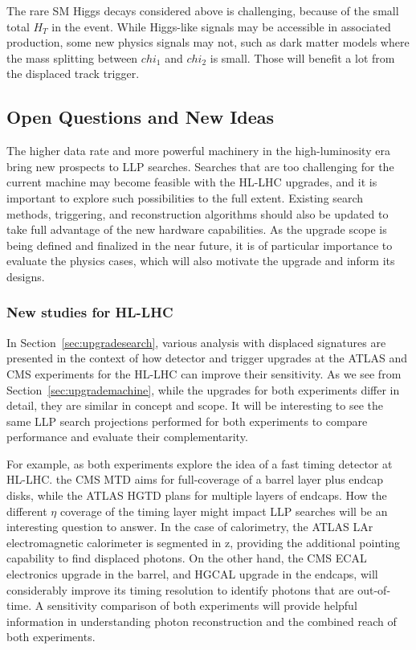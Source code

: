 The rare SM Higgs decays considered above is challenging, because of the small total $H_T$ in the event. 
While Higgs-like signals may be accessible in associated production, some new physics signals may not, such as dark matter models where the mass splitting between $chi_1$ and $chi_2$ is small. 
Those will benefit a lot from the displaced track trigger.

\subsection{Open Questions and New Ideas}\label{sec:upgradeideas}


The higher data rate and more powerful machinery in the high-luminosity era bring new prospects to LLP searches. 
Searches that are too challenging for the current machine may become feasible with the HL-LHC upgrades, and it is important to explore such possibilities to the full extent. 
Existing search methods, triggering, and reconstruction algorithms should also be updated to take full advantage of the new hardware capabilities. 
As the upgrade scope is being defined and finalized in the near future, it is of particular importance to evaluate the physics cases, which will also motivate the upgrade and inform its designs. 

\subsubsection{New studies for HL-LHC}

In Section~\ref{sec:upgradesearch}, various analysis with displaced signatures are presented in the context of how detector and trigger upgrades at the ATLAS and CMS experiments for the HL-LHC can improve their sensitivity. 
As we see from Section~\ref{sec:upgrademachine}, while the upgrades for both experiments differ in detail, they are similar in concept and scope. 
It will be interesting to see the same LLP search projections performed for both experiments to compare performance and evaluate their complementarity. 

For example, as both experiments explore the idea of a fast timing detector at HL-LHC. the CMS MTD aims for full-coverage of a barrel layer plus endcap disks, while the ATLAS HGTD plans for multiple layers of endcaps. 
How the different $\eta$ coverage of the timing layer might impact LLP searches will be an interesting question to answer. 
In the case of calorimetry, the ATLAS LAr electromagnetic calorimeter is segmented in z, providing the additional pointing capability to find displaced photons. 
On the other hand, the CMS ECAL electronics upgrade in the barrel, and HGCAL upgrade in the endcaps, will considerably improve its timing resolution to identify photons that are out-of-time. 
A sensitivity comparison of both experiments will provide helpful information in understanding photon reconstruction and the combined reach of both experiments. 

